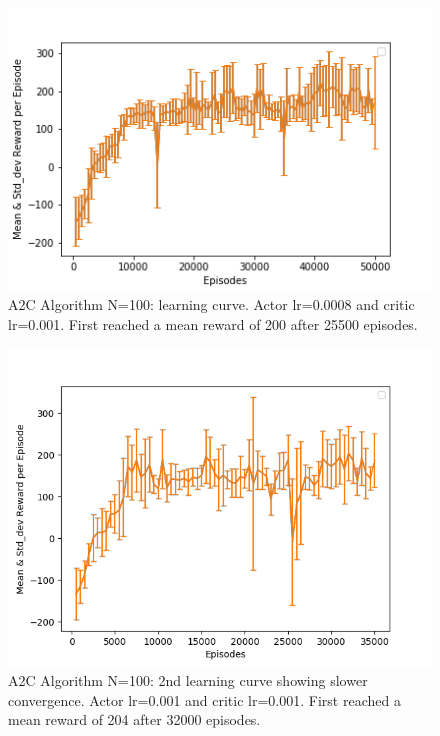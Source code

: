 \documentclass[12pt]{article}
\begin{document}
\begin{enumerate}
			\begin{figure}[H]
				\begin{center} 
					\includegraphics[scale=.73]{figures/A2C_LC_N=100_50.png}
				\end{center}
				\caption{A2C Algorithm N=100: learning curve. Actor lr=0.0008 and critic lr=0.001. First reached a mean reward of 200 after 25500 episodes.   } 	\label{5}%
			\end{figure}	
                
			\begin{figure}[H]
				\begin{center} 
					\includegraphics[scale=.73]{figures/A2C_LC_N=100_35.png}
				\end{center}
				\caption{A2C Algorithm N=100: 2nd learning curve showing slower convergence. Actor lr=0.001 and critic lr=0.001. First reached a mean reward of 204 after 32000 episodes.  } 	\label{6}%
			\end{figure}	  
				

\end{enumerate}
\end{document}
